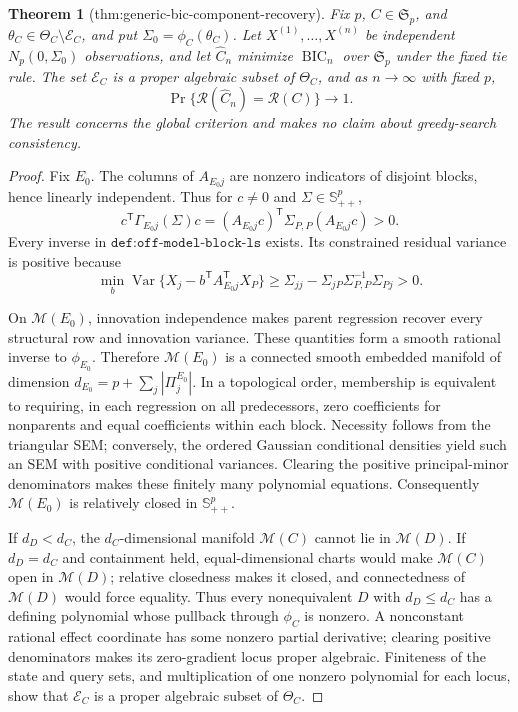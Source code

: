 \documentclass{article}
\newtheorem{theorem}{Theorem}
\begin{document}
\begin{theorem}[thm:generic-bic-component-recovery]\label{thm:generic-bic-component-recovery}
Fix \(p\), \(C\in\mathfrak S_p\), and \(\theta_C\in\Theta_C\setminus\mathcal E_C\), and put \(\Sigma_0=\phi_C(\theta_C)\). Let \(X^{(1)},\ldots,X^{(n)}\) be independent \(N_p(0,\Sigma_0)\) observations, and let \(\widehat C_n\) minimize \(\operatorname{BIC}_n\) over \(\mathfrak S_p\) under the fixed tie rule. The set \(\mathcal E_C\) is a proper algebraic subset of \(\Theta_C\), and as \(n\to\infty\) with fixed \(p\), \[\Pr\{\mathcal R(\widehat C_n)=\mathcal R(C)\}\longrightarrow1.\] The result concerns the global criterion and makes no claim about greedy-search consistency.
\end{theorem}
\begin{proof}
Fix \(E_0\).  The columns of \(A_{E_0j}\) are nonzero indicators of disjoint blocks, hence linearly independent.  Thus for \(c\ne0\) and \(\Sigma\in\mathbb S^p_{++}\),
\[
 c^{\mathsf T}\Gamma_{E_0j}(\Sigma)c
 =(A_{E_0j}c)^{\mathsf T}\Sigma_{P,P}(A_{E_0j}c)>0.
\]
Every inverse in \(\texttt{def:off-model-block-ls}\) exists.  Its constrained residual variance is positive because
\[
 \min_b\operatorname{Var}\{X_j-b^{\mathsf T}A_{E_0j}^{\mathsf T}X_P\}
 \ge\Sigma_{jj}-\Sigma_{jP}\Sigma_{P,P}^{-1}\Sigma_{Pj}>0.
\]

On \(\mathcal M(E_0)\), innovation independence makes parent regression recover every structural row and innovation variance.  These quantities form a smooth rational inverse to \(\phi_{E_0}\).  Therefore \(\mathcal M(E_0)\) is a connected smooth embedded manifold of dimension \(d_{E_0}=p+\sum_j|\Pi^{E_0}_j|\).  In a topological order, membership is equivalent to requiring, in each regression on all predecessors, zero coefficients for nonparents and equal coefficients within each block.  Necessity follows from the triangular SEM; conversely, the ordered Gaussian conditional densities yield such an SEM with positive conditional variances.  Clearing the positive principal-minor denominators makes these finitely many polynomial equations.  Consequently \(\mathcal M(E_0)\) is relatively closed in \(\mathbb S^p_{++}\).

If \(d_D<d_C\), the \(d_C\)-dimensional manifold \(\mathcal M(C)\) cannot lie in \(\mathcal M(D)\).  If \(d_D=d_C\) and containment held, equal-dimensional charts would make \(\mathcal M(C)\) open in \(\mathcal M(D)\); relative closedness makes it closed, and connectedness of \(\mathcal M(D)\) would force equality.  Thus every nonequivalent \(D\) with \(d_D\le d_C\) has a defining polynomial whose pullback through \(\phi_C\) is nonzero.  A nonconstant rational effect coordinate has some nonzero partial derivative; clearing positive denominators makes its zero-gradient locus proper algebraic.  Finiteness of the state and query sets, and multiplication of one nonzero polynomial for each locus, show that \(\mathcal E_C\) is a proper algebraic subset of \(\Theta_C\).


\end{proof}
\end{document}
